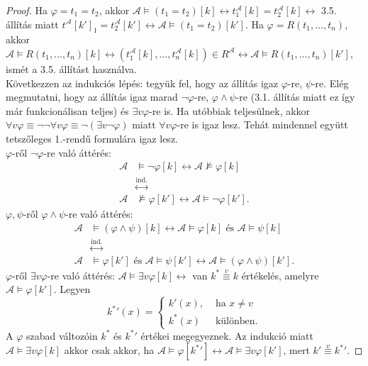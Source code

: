 \begin{proof}
Ha $\varphi = t_1 = t_2$, akkor $\mathcal{A} \models (t_1 = t_2)[k] \leftrightarrow t^\mathcal{A}_1[k] = t^{\mathcal{A}}_2[k] \leftrightarrow $ 3.5. állítás miatt $t^\mathcal{A}[k']_1 = t_2^\mathcal{A}[k'] \leftrightarrow \mathcal{A} \models (t_1 = t_2)[k']$. Ha $\varphi = R(t_1,\ldots,t_n)$, akkor $\mathcal{A} \models R(t_1,\ldots,t_n)[k] \leftrightarrow (t_1^\mathcal{A}[k],\ldots,t_n^{\mathcal{A}}[k]) \in R^{\mathcal{A}} \leftrightarrow \mathcal{A} \models R(t_1,\ldots,t_n)[k']$, ismét a 3.5. állítást használva. \\
\indent Következzen az indukciós lépés: tegyük fel, hogy az állítás igaz $\varphi$-re, $\psi$-re. Elég megmutatni, hogy az állítás igaz marad $\lnot \varphi$-re, $\varphi \land \psi$-re (3.1. állítás miatt ez így már funkcionálisan teljes) és $\exists v \varphi$-re is. Ha utóbbiak teljesülnek, akkor $\forall v \varphi \equiv \lnot \lnot \forall v \varphi \equiv \lnot (\exists v \lnot \varphi)$ miatt $\forall v \varphi$-re is igaz lesz. Tehát mindennel együtt tetszőleges 1.-rendű formulára igaz lesz. \\
\indent $\varphi$-ről $\lnot \varphi$-re való áttérés:
\begin{equation*}
\begin{split}
\mathcal{A}& \models \lnot \varphi[k] \leftrightarrow \mathcal{A} \not\models \varphi[k] \\
&\stackrel{\text{ind.}}{\leftrightarrow} \\
\mathcal{A}& \not \models \varphi[k'] \leftrightarrow \mathcal{A} \models \lnot \varphi[k'].
\end{split}
\end{equation*}
\indent $\varphi, \psi$-ről $\varphi \land \psi$-re való áttérés:
\begin{equation*}
\begin{split}
\mathcal{A} &\models (\varphi \land \psi)[k] \leftrightarrow \mathcal{A} \models \varphi[k] \text{ és } \mathcal{A} \models \psi[k] \\
&\stackrel{\text{ind.}}{\leftrightarrow} \\
\mathcal{A}& \models \varphi[k'] \text{ és } \mathcal{A} \models \psi[k'] \leftrightarrow \mathcal{A} \models (\varphi \land \psi)[k']. 
\end{split}
\end{equation*}
\indent $\varphi$-ről $\exists v \varphi$-re való áttérés:
$\mathcal{A} \models \exists v \varphi[k] \leftrightarrow$ van $k^* \stackrel{v}{\equiv} k$ értékelés, amelyre $\mathcal{A} \models \varphi[k']$. Legyen
$$k^*'(x) = 
\begin{cases}
k'(x), & \text{ ha } x \neq v \\
k^*(x) & \text{ különben.}
\end{cases}$$
A $\varphi$ szabad változóin $k^*$ és $k^*'$ értékei megegyeznek. Az indukció miatt $\mathcal{A} \models \exists v \varphi[k]$ akkor csak akkor, ha $\mathcal{A} \models \varphi[k^*'] \leftrightarrow \mathcal{A} \models \exists v \varphi[k']$, mert $k' \stackrel{v}{\equiv} k^*'$.
\end{proof}
